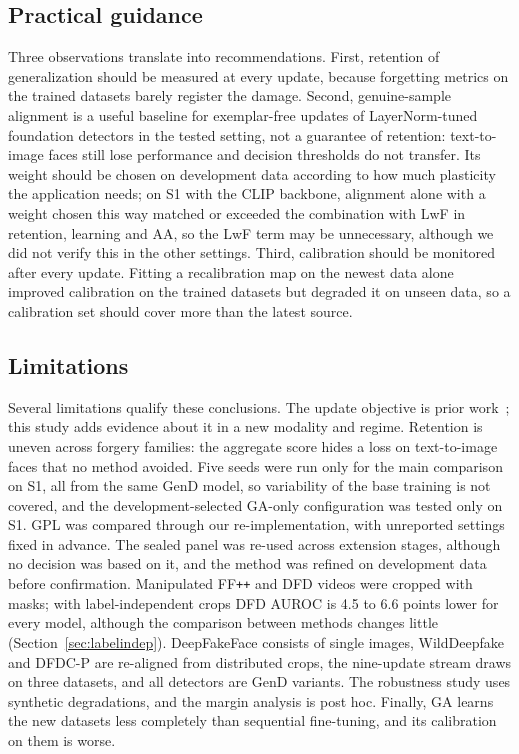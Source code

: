 \documentclass[journal]{IEEEtran}
\newcommand{\ffpp}{FF\texttt{++}}
\begin{document}
\subsection{Practical guidance}
Three observations translate into recommendations. First, retention of generalization should be measured at every update, because forgetting metrics on the trained datasets barely register the damage. Second, genuine-sample alignment is a useful baseline for exemplar-free updates of LayerNorm-tuned foundation detectors in the tested setting, not a guarantee of retention: text-to-image faces still lose performance and decision thresholds do not transfer. Its weight should be chosen on development data according to how much plasticity the application needs; on S1 with the CLIP backbone, alignment alone with a weight chosen this way matched or exceeded the combination with LwF in retention, learning and AA, so the LwF term may be unnecessary, although we did not verify this in the other settings. Third, calibration should be monitored after every update. Fitting a recalibration map on the newest data alone improved calibration on the trained datasets but degraded it on unseen data, so a calibration set should cover more than the latest source.

\subsection{Limitations}
Several limitations qualify these conclusions. The update objective is prior work~\cite{ma2021dfwf}; this study adds evidence about it in a new modality and regime. Retention is uneven across forgery families: the aggregate score hides a loss on text-to-image faces that no method avoided. Five seeds were run only for the main comparison on S1, all from the same GenD model, so variability of the base training is not covered, and the development-selected GA-only configuration was tested only on S1. GPL was compared through our re-implementation, with unreported settings fixed in advance. The sealed panel was re-used across extension stages, although no decision was based on it, and the method was refined on development data before confirmation. Manipulated \ffpp{} and DFD videos were cropped with masks; with label-independent crops DFD AUROC is 4.5 to 6.6 points lower for every model, although the comparison between methods changes little (Section~\ref{sec:labelindep}). DeepFakeFace consists of single images, WildDeepfake and DFDC-P are re-aligned from distributed crops, the nine-update stream draws on three datasets, and all detectors are GenD variants. The robustness study uses synthetic degradations, and the margin analysis is post hoc. Finally, GA learns the new datasets less completely than sequential fine-tuning, and its calibration on them is worse.
\end{document}
